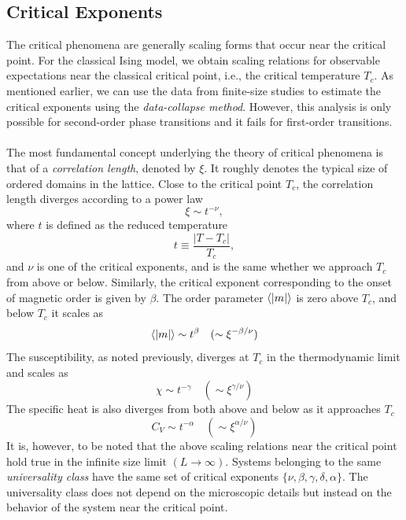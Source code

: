 \documentclass[../thesis_main.tex]{subfiles}
\begin{document}
\subsection{Critical Exponents}
The critical phenomena are generally scaling forms that occur near the critical point. For the classical Ising model, we obtain scaling relations for observable expectations near the classical critical point, i.e., the critical temperature $T_c$. As mentioned earlier, we can use the data from finite-size studies to estimate the critical exponents using the \textit{data-collapse method}. However, this analysis is only possible for second-order phase transitions and it fails for first-order transitions. ~\\~\\
The most fundamental concept underlying the theory of critical phenomena is that of a \textit{correlation length}, denoted by $\xi$. It roughly denotes the typical size of ordered domains in the lattice. Close to the critical point $T_c$, the correlation length diverges according to a power law
\begin{equation}
    \xi \sim t^{-\nu},
\end{equation}
where $t$ is defined as the reduced temperature 
\begin{equation}
    t \equiv \frac{|T-T_c|}{T_c},
\end{equation}
and $\nu$ is one of the critical exponents, and is the same whether we approach $T_c$ from above or below. Similarly, the critical exponent corresponding to the onset of magnetic order is given by $\beta$. The order parameter $\expval{|m|}$ is zero above $T_c$, and below $T_c$ it scales as
\begin{equation}
    \expval{|m|} \sim t^\beta \quad (\sim \xi^{-\beta/\nu})
\end{equation}
The susceptibility, as noted previously, diverges at $T_c$ in the thermodynamic limit and scales as 
\begin{equation}
    \chi \sim t^{-\gamma} \quad (\sim \xi^{\gamma/\nu})
\end{equation} 
The specific heat is also diverges from both above and below as it approaches $T_c$ 
\begin{equation}
    C_V \sim t^{-\alpha} \quad (\sim \xi^{\alpha/\nu})
\end{equation}
It is, however, to be noted that the above scaling relations near the critical point hold true in the infinite size limit $(L \to \infty)$. Systems belonging to the same \textit{universality class} have the same set of critical exponents $\{ \nu, \beta, \gamma, \delta, \alpha \}$. The universality class does not depend on the microscopic details but instead on the behavior of the system near the critical point.
\end{document}
